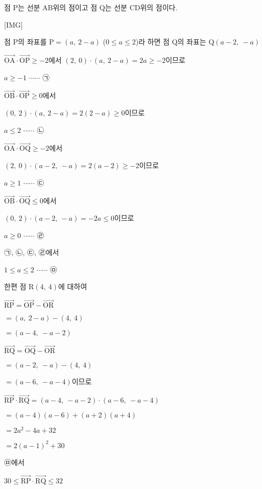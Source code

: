 \documentclass{oblivoir}
\begin{document}
점 $\mathrm{P}$는 선분 $\mathrm{AB}$위의 점이고 점 $\mathrm{Q}$는 선분 $\mathrm{CD}$위의 점이다.

[IMG]

점 $\mathrm{P}$의 좌표를 $\mathrm{P}=(a ,\:  2-a)$ ($0\le a\le 2$)라 하면 점 $\mathrm{Q}$의 좌표는 $\mathrm{Q}(a-2 ,\:  -a)$

$\overrightarrow{\mathrm{OA}}\cdot\overrightarrow{\mathrm{OP}}\ge -2$에서 $(2,\: 0)\cdot(a ,\:  2- a)= 2a\ge -2$이므로 

$a\ge -1$ $\cdots\cdots$ ㉠

$\overrightarrow{\mathrm{OB}}\cdot\overrightarrow{\mathrm{OP}}\ge 0$에서 

$(0,\:2)\cdot(a,\: 2-a)= 2(2-a)\ge 0$이므로 

$a\le 2$ $\cdots\cdots$ ㉡

$\overrightarrow{\mathrm{OA}}\cdot\overrightarrow{\mathrm{OQ}}\ge -2$에서

$(2,\:  0)\cdot(a-2 ,\: - a)= 2(a- 2)\ge - 2$이므로 

$a\ge 1$ $\cdots\cdots$ ㉢

$\overrightarrow{\mathrm{OB}}\cdot\overrightarrow{\mathrm{OQ}}\le 0$에서 

$(0,\:2)\cdot(a-2,\:  - a)= -2a\le 0$이므로

$a\ge 0$ $\cdots\cdots$ ㉣

㉠, ㉡, ㉢, ㉣에서 

$1\le a\le 2$ $\cdots\cdots$ ㉤

한편 점 $\mathrm{R}(4,\: 4)$에 대하여

$\overrightarrow{\mathrm{RP}}$$=\overrightarrow{\mathrm{OP}} -\overrightarrow{\mathrm{OR}}$

$=(a,\:  2-a)-(4,\:  4)$

$=(a-4 ,\:  -a -2)$

$\overrightarrow{\mathrm{RQ}}$$=\overrightarrow{\mathrm{OQ}} -\overrightarrow{\mathrm{OR}}$

$=(a-2 ,\:  -a)-(4,\:  4)$

$=(a-6 ,\:  -a -4)$이므로

$\overrightarrow{\mathrm{RP}}\cdot\overrightarrow{\mathrm{RQ}}$$=(a-4 ,\:  -a -2)\cdot(a-6,\:  -a-4)$

$=(a-4)(a-6)+(a+2)(a+4)$

$= 2a^{2}- 4a + 32$

$= 2(a-1)^{2}+ 30$

㉤에서 

$30\le\overrightarrow{\mathrm{RP}}\cdot\overrightarrow{\mathrm{RQ}}\le 32$
\end{document}
